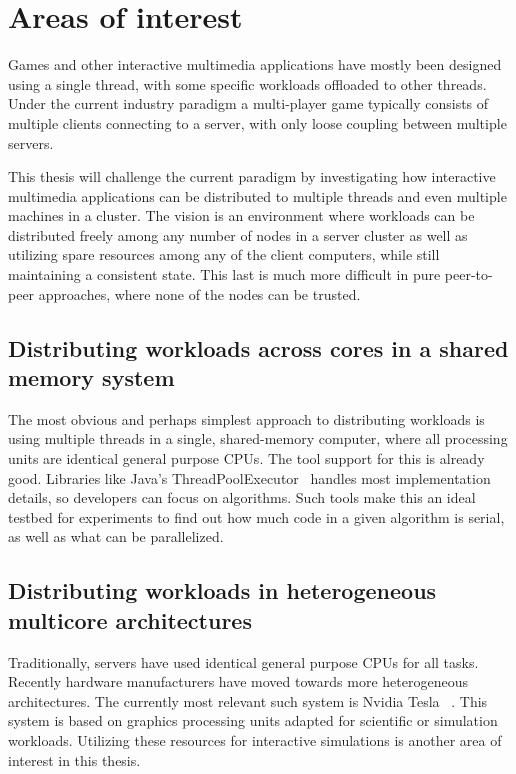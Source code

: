 \documentclass{article}
\begin{document}
\section{Areas of interest}
Games and other interactive multimedia applications have mostly been
designed using a single thread, with some specific workloads offloaded
to other threads. Under the current industry paradigm a multi-player game typically
consists of multiple clients connecting to a server, with only loose coupling between multiple servers.


This thesis will challenge the current paradigm by investigating how interactive multimedia applications
can be distributed to multiple threads and even multiple machines in a cluster.
The vision is an environment where workloads can be distributed freely among any number of nodes in a
server cluster as well as utilizing spare resources among any of the client computers, while still maintaining
a consistent state. This last is much more difficult in pure peer-to-peer approaches, where none of the nodes can be trusted.


\subsection {Distributing workloads across cores in a shared memory system}
The most obvious and perhaps simplest approach to distributing
workloads is using multiple threads in a single, shared-memory
computer, where all processing units are identical general purpose CPUs. The tool support for this is already good. Libraries
like Java's ThreadPoolExecutor~\cite{threadpool} handles most
implementation details, so developers can focus on algorithms. Such tools
make this an ideal testbed for experiments to find out how much code in
a given algorithm is serial, as well as what can be parallelized.

\subsection {Distributing workloads in heterogeneous multicore architectures}
Traditionally, servers have used identical general purpose CPUs for all tasks. Recently hardware manufacturers have moved
towards more heterogeneous architectures. The currently most relevant such system is Nvidia Tesla ~\cite{tesla}. This system
is based on graphics processing units adapted for scientific or simulation workloads. Utilizing these resources for interactive simulations is another area of interest in this thesis.
\end{document}
